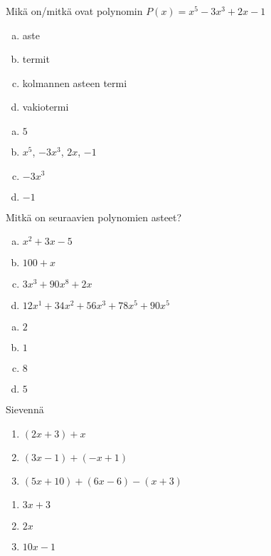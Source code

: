 \begin{tehtava}
	Mikä on/mitkä ovat polynomin $P(x) = x^5-3x^3+2x-1$
	\begin{enumerate}[a)]
		\item aste
		\item termit
		\item kolmannen asteen termi
		\item vakiotermi
	\end{enumerate}

	\begin{vastaus}
		\begin{enumerate}[a)]
			\item $5$
			\item $x^5$, $-3x^3$, $2x$, $-1$
			\item $-3x^3$
			\item $-1$
		\end{enumerate}
	\end{vastaus}
\end{tehtava}

\begin{tehtava}
	Mitkä on seuraavien polynomien asteet?
	\begin{enumerate}[a)]
		\item $x^2 + 3x - 5$
		\item $100 + x$
		\item $3x^3 + 90x^8 + 2x$
		\item $12x^1 + 34x^2 + 56x^3 + 78x^5 + 90x^5$
	\end{enumerate}

	\begin{vastaus}
		\begin{enumerate}[a)]
			\item $2$
			\item $1$
			\item $8$
			\item $5$
		\end{enumerate}
	\end{vastaus}
\end{tehtava}

\begin{tehtava}
    Sievennä
    \begin{enumerate}
        \item $(2x + 3) + x $
        \item $(3x - 1) + (-x + 1)$
        \item $(5x + 10) + (6x - 6) - (x + 3)$
    \end{enumerate}
    \begin{vastaus}
        \begin{enumerate}
            \item $3x + 3$
            \item $2x$
            \item $10x - 1$
        \end{enumerate}
    \end{vastaus}
\end{tehtava}

